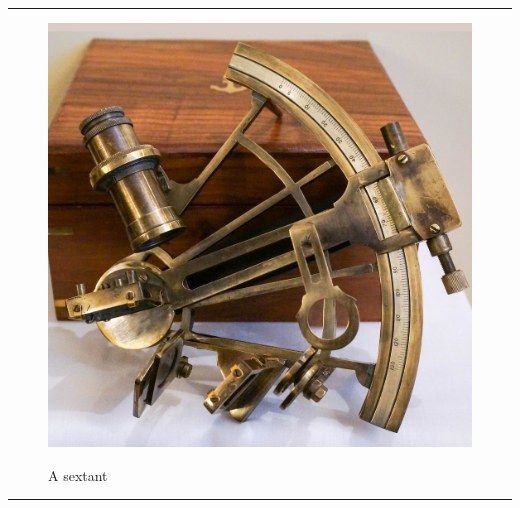 \documentclass{article}
\begin{document}
    
        \par\noindent\rule{\textwidth}{0.4pt}
    \begin{figure}[H]
        \centering
        \begin{minipage}{0.25\textwidth}
            \centering
            \includegraphics[width=\textwidth]{../SurvivalItemImages/sextant}
        \end{minipage}\hfill
        \begin{minipage}{0.7\textwidth}
            \centering
            \Large A sextant
        \end{minipage}
    \end{figure}
    \vspace{-0.8em}
    \noindent\rule{\textwidth}{0.4pt}
            
\end{document}
